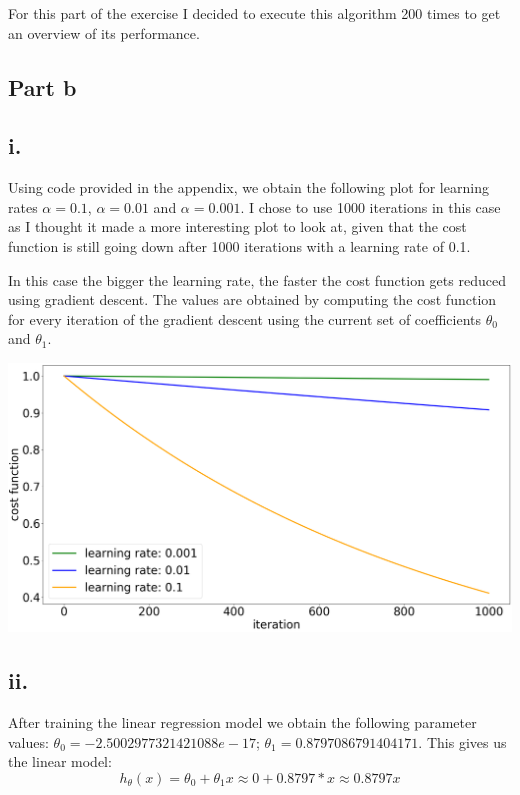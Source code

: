 \documentclass[10pt]{article}
\begin{document}
For this part of the exercise I decided to execute this algorithm 200 times to get an overview of its performance.

\subsection*{Part b}
\subsection*{i.}
Using code provided in the appendix, we obtain the following plot for
learning rates $\alpha = 0.1$, $\alpha = 0.01$ and $\alpha = 0.001$.
I chose to use 1000 iterations in this case as I thought it made a more
interesting plot to look at, given that the cost function is still going down after
1000 iterations with a learning rate of 0.1.

In this case the bigger the learning rate, the faster the cost function
gets reduced using gradient descent. The values are obtained by computing the cost function
for every iteration of the gradient descent using the current set of coefficients $\theta_{0}$ and
$\theta_{1}$. 


\vspace{5mm} %
\includegraphics[scale=0.23]{Figure_1.png}

\subsection*{ii.}
After training the linear regression model we obtain the following parameter values:
$\theta_{0} = -2.5002977321421088e-17$; $\theta_{1} = 0.8797086791404171$. 
This gives us the linear model:
\begin{equation*}
    h_{\theta}(x) = \theta_{0} + \theta_{1}x \approx 0 + 0.8797 * x \approx 0.8797x
\end{equation*}
\end{document}
